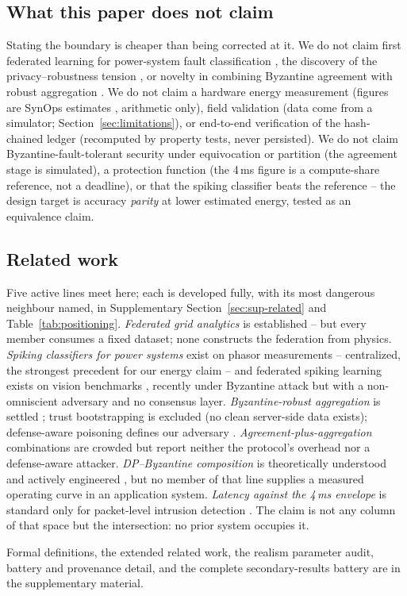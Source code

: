 \subsection{What this paper does not claim}
\label{sec:nonclaims}

Stating the boundary is cheaper than being corrected at it. We do not
claim first federated learning for power-system fault classification
\cite{husnoo2023fedisa,husnoo2023feddisc}, the discovery of the
privacy--robustness tension \cite{guerraoui2021podc}, or novelty in
combining Byzantine agreement with robust aggregation
\cite{kfc2025,li2024brfl}. We do not claim a hardware energy measurement
(figures are SynOps estimates \cite{horowitz2014}, arithmetic only),
field validation (data come from a simulator;
Section~\ref{sec:limitations}), or end-to-end verification of the
hash-chained ledger (recomputed by property tests, never persisted). We
do not claim Byzantine-fault-tolerant security under equivocation or
partition (the agreement stage is simulated), a protection function (the
4\,ms figure is a compute-share reference, not a deadline), or that the
spiking classifier beats the reference -- the design target is accuracy
\emph{parity} at lower estimated energy, tested as an equivalence claim.

\subsection{Related work}
\label{sec:related}

Five active lines meet here; each is developed fully, with its most
dangerous neighbour named, in Supplementary Section~\ref{sec:sup-related}
and Table~\ref{tab:positioning}. \emph{Federated grid analytics} is
established \cite{husnoo2023fedisa,husnoo2023feddisc,li2025fdia} -- but
every member consumes a fixed dataset; none constructs the federation
from physics. \emph{Spiking classifiers for power systems} exist on
phasor measurements \cite{mahapatra2021} -- centralized, the strongest
precedent for our energy claim -- and federated spiking learning exists
on vision benchmarks \cite{venkatesha2021,aouedi2023hfedsnn}, recently
under Byzantine attack \cite{nguyen2025robust} but with a non-omniscient
adversary and no consensus layer. \emph{Byzantine-robust
aggregation} is settled \cite{blanchard2017,pillutla2022}; trust
bootstrapping \cite{cao2021fltrust} is excluded (no clean server-side
data exists); defense-aware poisoning defines our adversary
\cite{fang2020,shejwalkar2021,baruch2019,xie2019}.
\emph{Agreement-plus-aggregation} combinations are crowded
\cite{kfc2025,li2024brfl} but report neither the protocol's overhead nor
a defense-aware attacker. \emph{DP--Byzantine composition} is
theoretically understood \cite{guerraoui2021podc} and actively
engineered \cite{gu2024dpbrem}, but no member
of that line supplies a measured operating curve in an application
system. \emph{Latency against the 4\,ms envelope} is standard only for
packet-level intrusion detection \cite{ustun2021,moore2026}. The claim
is not any column of that space but the intersection: no prior system
occupies it.

Formal definitions, the extended related work, the realism parameter
audit, battery and provenance detail, and the complete secondary-results
battery are in the supplementary material.
